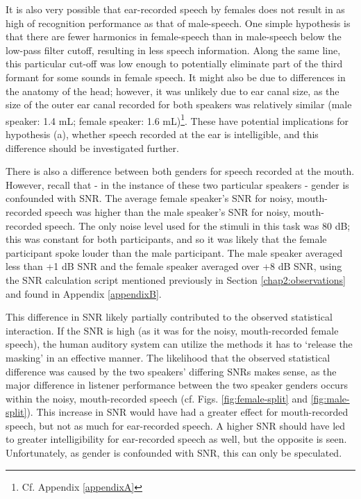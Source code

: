It is also very possible that ear-recorded speech by females does not result in as high of recognition performance as that of male-speech.  One simple hypothesis is that there are fewer harmonics in female-speech than in male-speech below the low-pass filter cutoff, resulting in less speech information.  Along the same line, this particular cut-off was low enough to potentially eliminate part of the third formant for some sounds in female speech.  It might also be due to differences in the anatomy of the head; however, it was unlikely due to ear canal size, as the size of the outer ear canal recorded for both speakers was relatively similar (male speaker: 1.4 mL; female speaker: 1.6 mL)\footnote{Cf. Appendix \ref{appendixA}}.  These have potential implications for hypothesis (a), whether speech recorded at the ear is intelligible, and this difference should be investigated further.
%
%

There is also a difference between both genders for speech recorded at the mouth.
However, recall that - in the instance of these two particular speakers - gender is confounded with SNR.  The average female speaker's SNR for noisy, mouth-recorded speech was higher than the male speaker's SNR for noisy, mouth-recorded speech.  The only noise level used for the stimuli in this task was 80 dB; this was constant for both participants, and so it was likely that the female participant spoke louder than the male participant.  The male speaker averaged less than +1 dB SNR and the female speaker averaged over +8 dB SNR, using the SNR calculation script mentioned previously in Section \ref{chap2:observations} and found in Appendix \ref{appendixB}.

This difference in SNR likely partially contributed to the observed statistical interaction.  If the SNR is high (as it was for the noisy, mouth-recorded female speech), the human auditory system can utilize the methods it has to `release the masking' in an effective manner.  The likelihood that the observed statistical difference was caused by the two speakers' differing SNRs makes sense, as the major difference in listener performance between the two speaker genders occurs within the noisy, mouth-recorded speech (cf. Figs. \ref{fig:female-split} and \ref{fig:male-split}).  This increase in SNR would have had a greater effect for mouth-recorded speech, but not as much for ear-recorded speech.  A higher SNR should have led to greater intelligibility for ear-recorded speech as well, but the opposite is seen.  Unfortunately, as gender is confounded with SNR, this can only be speculated.



